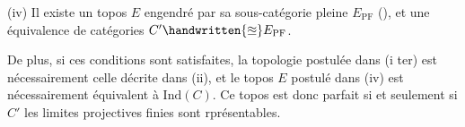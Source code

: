 (iv) Il existe un topos $E$ engendré par sa sous-catégorie pleine
\reversemarginpar\margin{\handwritten{$\times$}}\normalmarginpar
$E_{\mathrm{PF}}$ (\quad\quad), et une équivalence de catégories $C'\handwritten{\approxeq}E_{\mathrm{PF}}$.

De plus,  si ces conditions sont satisfaites, la topologie postulée dans (i ter) est nécessairement celle décrite dans (ii), et le topos $E$ postulé dans (iv) est nécessairement équivalent à $\mathrm{Ind}(C)$. Ce topos est donc parfait si et seulement si  $C'$  les limites projectives finies sont rprésentables.

